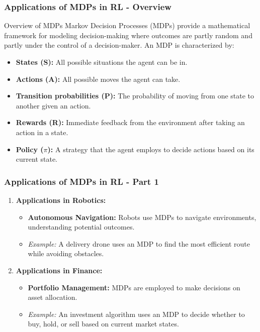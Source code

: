 \documentclass{beamer}
\begin{document}
\begin{frame}[fragile]
    \frametitle{Applications of MDPs in RL - Overview}
    \begin{block}{Overview of MDPs}
        Markov Decision Processes (MDPs) provide a mathematical framework for modeling decision-making where outcomes are partly random and partly under the control of a decision-maker. An MDP is characterized by:
    \end{block}
    \begin{itemize}
        \item \textbf{States (S):} All possible situations the agent can be in.
        \item \textbf{Actions (A):} All possible moves the agent can take.
        \item \textbf{Transition probabilities (P):} The probability of moving from one state to another given an action.
        \item \textbf{Rewards (R):} Immediate feedback from the environment after taking an action in a state.
        \item \textbf{Policy ($\pi$):} A strategy that the agent employs to decide actions based on its current state.
    \end{itemize}
\end{frame}

\begin{frame}[fragile]
    \frametitle{Applications of MDPs in RL - Part 1}
    \begin{enumerate}
        \item \textbf{Applications in Robotics:}
            \begin{itemize}
                \item \textbf{Autonomous Navigation:} Robots use MDPs to navigate environments, understanding potential outcomes.
                \item \textit{Example:} A delivery drone uses an MDP to find the most efficient route while avoiding obstacles.
            \end{itemize}

        \item \textbf{Applications in Finance:}
            \begin{itemize}
                \item \textbf{Portfolio Management:} MDPs are employed to make decisions on asset allocation.
                \item \textit{Example:} An investment algorithm uses an MDP to decide whether to buy, hold, or sell based on current market states.
            \end{itemize}
    \end{enumerate}
\end{frame}
\end{document}
